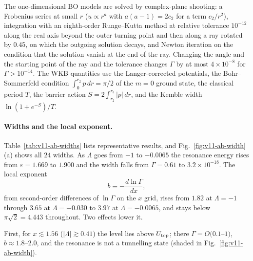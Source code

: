 The one-dimensional BO models are solved by complex-plane shooting: a Frobenius series at small $r$ ($u\propto r^a$ with $a(a-1)=2c_2$ for a term $c_2/r^2$), integration with an eighth-order Runge--Kutta method at relative tolerance $10^{-12}$ along the real axis beyond the outer turning point and then along a ray rotated by $0.45$, on which the outgoing solution decays, and Newton iteration on the condition that the solution vanish at the end of the ray. %
Changing the angle and the starting point of the ray and the tolerance changes $\Gamma$ by at most $4\times10^{-8}$ for $\Gamma>10^{-14}$. %
The WKB quantities use the Langer-corrected potentials, the Bohr--Sommerfeld condition $\int_0^{r_2}p\,dr=\pi/2$ of the $m=0$ ground state, the classical period $T$, the barrier action $S=2\int_{r_2}^{r_3}|p|\,dr$, and the Kemble width $\ln(1+e^{-S})/T$.

\paragraph{Widths and the local exponent.}
Table~\ref{tab:v11-ab-widths} lists representative results, and Fig.~\ref{fig:v11-ab-width}(a) shows all $24$ widths. %
As $\Lambda$ goes from $-1$ to $-0.0065$ the resonance energy rises from $\varepsilon=1.669$ to $1.900$ and the width falls from $\Gamma=0.61$ to $3.2\times10^{-18}$. %
The local exponent
\begin{equation}
b\equiv-\frac{d\ln\Gamma}{dx},
\label{eq:v11-ab-b}
\end{equation}
from second-order differences of $\ln\Gamma$ on the $x$ grid, rises from $1.82$ at $\Lambda=-1$ through $3.65$ at $\Lambda=-0.030$ to $3.97$ at $\Lambda=-0.0065$, and stays below $\pi\sqrt2=4.443$ throughout. %
Two effects lower it.

First, for $x\lesssim1.56$ ($|\Lambda|\gtrsim0.41$) the level lies above $U_{\rm top}$; there $\Gamma=O(0.1$--$1)$, $b\approx1.8$--$2.0$, and the resonance is not a tunnelling state (shaded in Fig.~\ref{fig:v11-ab-width}). %

